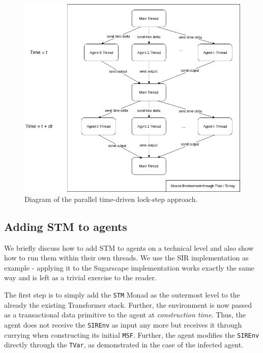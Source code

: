 \begin{figure}
	\centering
	\includegraphics[width=1.0\textwidth, angle=0]{./fig/concurrentabs/stm_abs.png}
	\caption{Diagram of the parallel time-driven lock-step approach.}
	\label{fig:stm_abs_structure}
\end{figure}

\subsection{Adding STM to agents}
We briefly discuss how to add STM to agents on a technical level and also show how to run them within their own threads. We use the SIR implementation as example - applying it to the Sugarscape implementation works exactly the same way and is left as a trivial exercise to the reader.

The first step is to simply add the \texttt{STM} Monad as the outermost level to the already the existing Transformer stack. Further, the environment is now passed as a transactional data primitive to the agent at \textit{construction time}. Thus, the agent does not receive the \texttt{SIREnv} as input any more but receives it through currying when constructing its initial \texttt{MSF}. Further, the agent modifies the \texttt{SIREnv} directly through the \texttt{TVar}, as demonstrated in the case of the infected agent.

